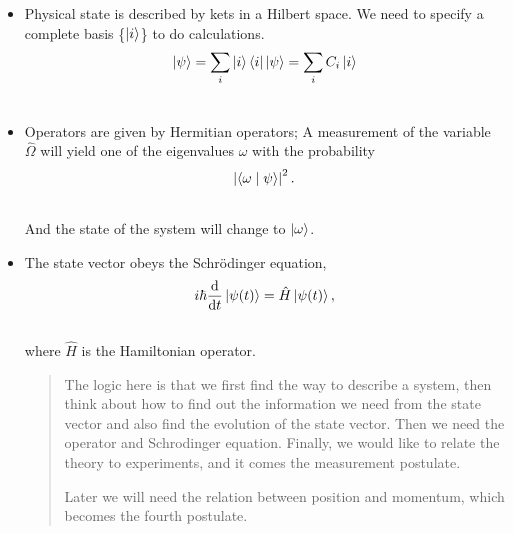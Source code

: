\documentclass[letterpaper,10pt,english]{sphinxmanual}
\begin{document}
\label{QuantumMechanics:first-three-postulates}\begin{itemize}
\item {} 
Physical state is described by kets in a Hilbert space. We need to specify a complete basis \{$\left| i\right\rangle$\} to do calculations.
\begin{gather}
\begin{split}\left| \psi\right\rangle = \sum_i \left| i\right\rangle\left\langle i\right|\left| \psi\right\rangle = \sum_i C_i \left| i\right\rangle\end{split}\notag\\\begin{split}\end{split}\notag
\end{gather}
\item {} 
Operators are given by Hermitian operators; A measurement of the variable $\hat \Omega$ will yield one of the eigenvalues $\omega$ with the probability
\begin{gather}
\begin{split}\left|\langle \omega \mid \psi \rangle\right|^2 .\end{split}\notag\\\begin{split}\end{split}\notag
\end{gather}
And the state of the system will change to $\left| \omega\right\rangle$.

\item {} 
The state vector obeys the Schrödinger equation,
\begin{gather}
\begin{split}i\hbar \frac{\mathrm{d}}{\mathrm{d} t}\left| \psi(t)\right\rangle = \hat H \left| \psi(t)\right\rangle ,\end{split}\notag\\\begin{split}\end{split}\notag
\end{gather}
where $\hat H$ is the Hamiltonian operator.
\begin{quote}

The logic here is that we first find the way to describe a system, then think about how to find out the information we need from the state vector and also find the evolution of the state vector. Then we need the operator and Schrodinger equation. Finally, we would like to relate the theory to experiments, and it comes the measurement postulate.

Later we will need the relation between position and momentum, which becomes the fourth postulate.
\end{quote}


\end{itemize}
\end{document}
